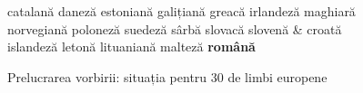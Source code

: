 \begin{figure}[tb]
\begin{tabular}
catalană \newline 
daneză \newline 
estoniană \newline 
galițiană\newline 
greacă \newline 
irlandeză \newline 
maghiară \newline
norvegiană \newline 
poloneză \newline 
suedeză \newline
sârbă \newline 
slovacă \newline 
slovenă \newline 
& \vspace*{0.5mm} 
croată \newline 
islandeză\newline 
letonă \newline 
lituaniană \newline 
malteză \newline 
\textbf{română}\\
\end{tabular}
\caption{Prelucrarea vorbirii: situația pentru 30 de limbi europene}
\label{fig:speech_cluster_de}
\end{figure}

